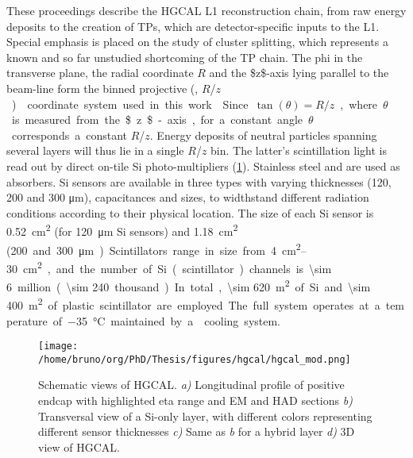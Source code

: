 \documentclass[11pt]{article}
\newcommand{\coordsa}{(\si{\azi}, \si{\rz})}
\newcommand{\rz}{$R$/$z$}
\begin{document}
These proceedings describe the \ac{HGCAL} \ac{L1} reconstruction chain, from raw energy deposits to the creation of \acp{TP}, which are detector-specific inputs to the \ac{L1}.
Special emphasis is placed on the study of cluster splitting, which represents a known and so far unstudied shortcoming of the \ac{TP} chain.
The \ac{phi} in the transverse plane, the radial coordinate \(R\) and the \$z\$-axis lying parallel to the beam-line form the binned projective \coordsa{} coordinate system used in this work \cite{cms_collab}.
Since \(\tan(\theta) = R/z\), where \(\theta\) is measured from the \$z\$-axis, for a constant angle \(\theta\) corresponds a constant \rz{}.
Energy deposits of neutral particles spanning several layers will thus lie in a single \rz{} bin.
The latter's scintillation light is read out by direct on-tile \ac{Si} photo-multipliers (\cref{fig:hgcal}). Stainless steel and  are used as absorbers.
\ac{Si} sensors are available in three types with varying thicknesses (120, 200 and 300 \si{\micro\meter}), capacitances and sizes, to widthstand different radiation conditions according to their physical location.
The size of each \ac{Si} sensor is \SI{0.52}{\cm\squared} (for \SI{120}{\micro\meter} \ac{Si} sensors) and \SI{1.18}{\cm\squared} (\qty{200} and \SI{300}{\micro\meter}).
Scintillators range in size from \qtyrange{4}{30}{\cm\squared}, and the number of \ac{Si} (scintillator) channels is \num{\sim 6} million (\num{\sim 240} thousand).
In total, \SI{\sim 620}{\meter\squared} of \ac{Si} and \SI{\sim 400}{\meter\squared} of plastic scintillator are employed.
The full system operates at a temperature of \SI{-35}{\celsius} maintained by a  cooling system.

\begin{figure}[htbp]
\centering
\texttt{[image: /home/bruno/org/PhD/Thesis/figures/hgcal/hgcal\_mod.png]}
\caption{\label{fig:hgcal}Schematic views of \ac{HGCAL}. \textit{a)} Longitudinal profile of positive endcap with highlighted \ac{eta} range and \ac{EM} and \ac{HAD} sections \emph{b)} Transversal view of a \ac{Si}-only layer, with different colors representing different sensor thicknesses \emph{c)} Same as \textit{b} for a hybrid layer \emph{d)} 3D view of \ac{HGCAL}.}
\end{figure}
\end{document}

